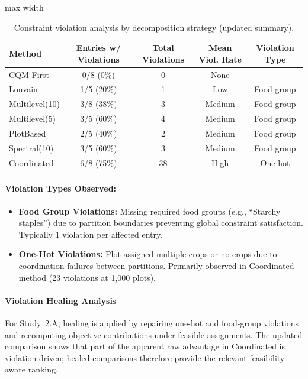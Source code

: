 \documentclass{oqireport}
\begin{document}
\begin{enumerate}[label=\textbf{Result \arabic*.}, leftmargin=*, align=left, itemsep=1em]
\begin{table}[H]
\centering
\caption{Constraint violation analysis by decomposition strategy (updated summary).}
\label{tab:violation_by_strategy}
\small
\begin{adjustbox}{max width = \textwidth}
    
\begin{tabular}{lcccc}
\toprule
\textbf{Method} & \textbf{Entries w/ Violations} & \textbf{Total Violations} & \textbf{Mean Viol. Rate} & \textbf{Violation Type} \\
\midrule
CQM-First & 0/8 (0\%) & 0 & None & --- \\
Louvain & 1/5 (20\%) & 1 & Low & Food group \\
Multilevel(10) & 3/8 (38\%) & 3 & Medium & Food group \\
Multilevel(5) & 3/5 (60\%) & 4 & Medium & Food group \\
PlotBased & 2/5 (40\%) & 2 & Medium & Food group \\
Spectral(10) & 3/5 (60\%) & 3 & Medium & Food group \\
Coordinated & 6/8 (75\%) & 38 & High & One-hot \\
\bottomrule
\end{tabular}
\end{adjustbox}
\end{table}

\paragraph{Violation Types Observed:}
\begin{itemize}
    \item \textbf{Food Group Violations:} Missing required food groups (e.g., ``Starchy staples'') due to partition boundaries preventing global constraint satisfaction. Typically 1 violation per affected entry.
    \item \textbf{One-Hot Violations:} Plot assigned multiple crops or no crops due to coordination failures between partitions. Primarily observed in Coordinated method (23 violations at 1,000 plots).
\end{itemize}

\paragraph{Violation Healing Analysis}
For Study~2.A, healing is applied by repairing one-hot and food-group violations and recomputing objective contributions under feasible assignments. The updated comparison shows that part of the apparent raw advantage in Coordinated is violation-driven; healed comparisons therefore provide the relevant feasibility-aware ranking.


\end{enumerate}
\end{document}
